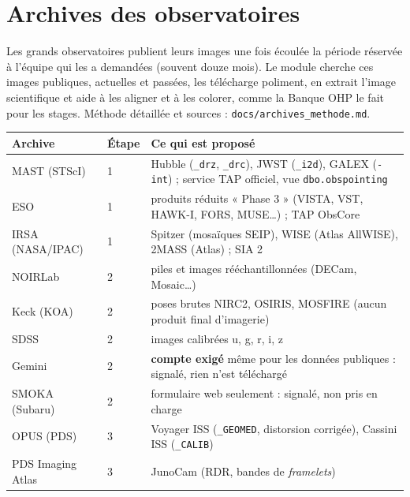 \section{Archives des observatoires}\label{sec:archives}
Les grands observatoires publient leurs images une fois écoulée la période réservée à l'équipe qui les a
demandées (souvent douze mois). Le module cherche ces images publiques, actuelles et passées, les télécharge
poliment, en extrait l'image scientifique et aide à les aligner et à les colorer, comme la Banque OHP le fait pour
les stages. Méthode détaillée et sources : \texttt{docs/archives\_methode.md}.

\begin{center}\small
\begin{tabularx}{\linewidth}{@{}llX@{}}
\toprule
\textbf{Archive} & \textbf{Étape} & \textbf{Ce qui est proposé}\\
\midrule
MAST (STScI) & 1 & Hubble (\texttt{\_drz}, \texttt{\_drc}), JWST (\texttt{\_i2d}), GALEX (\texttt{-int}) ; service TAP officiel, vue \texttt{dbo.obspointing}\\
ESO & 1 & produits réduits « Phase 3 » (VISTA, VST, HAWK-I, FORS, MUSE…) ; TAP ObsCore\\
IRSA (NASA/IPAC) & 1 & Spitzer (mosaïques SEIP), WISE (Atlas AllWISE), 2MASS (Atlas) ; SIA 2\\
NOIRLab & 2 & piles et images rééchantillonnées (DECam, Mosaic…)\\
Keck (KOA) & 2 & poses brutes NIRC2, OSIRIS, MOSFIRE (aucun produit final d'imagerie)\\
SDSS & 2 & images calibrées u, g, r, i, z\\
Gemini & 2 & \textbf{compte exigé} même pour les données publiques : signalé, rien n'est téléchargé\\
SMOKA (Subaru) & 2 & formulaire web seulement : signalé, non pris en charge\\
OPUS (PDS) & 3 & Voyager ISS (\texttt{\_GEOMED}, distorsion corrigée), Cassini ISS (\texttt{\_CALIB})\\
PDS Imaging Atlas & 3 & JunoCam (RDR, bandes de \emph{framelets})\\
\bottomrule
\end{tabularx}
\end{center}

